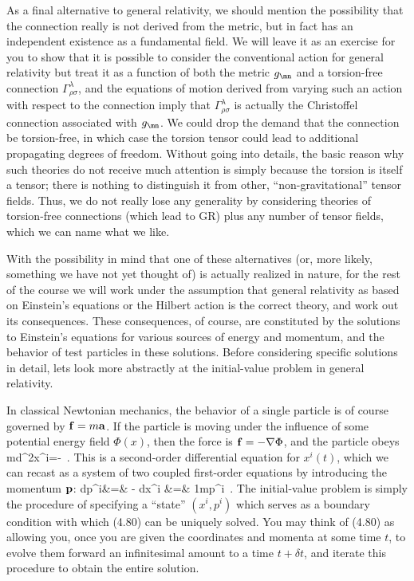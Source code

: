As a final alternative to general relativity, we should mention the
possibility that the connection really is not derived from the metric,
but in fact has an independent existence as a fundamental field.
We will leave it as an exercise for you to show that it is possible
to consider the conventional action for general relativity but treat
it as a function of both the metric $g_\mn$ and a torsion-free connection
$\Gamma^\lambda_{\rho\sigma}$,
and the equations of motion derived from varying such an action with
respect to the connection imply that $\Gamma^\lambda_{\rho\sigma}$ is
actually the Christoffel connection associated with $g_\mn$.  We could
drop the demand that the connection be torsion-free, in which case the
torsion tensor could lead to additional propagating degrees of freedom.
Without going into details, the basic reason why such theories do not
receive much attention is simply because the torsion is itself a tensor;
there is nothing to distinguish it from other, ``non-gravitational''
tensor fields.  Thus, we do not really lose any generality by considering
theories of torsion-free connections (which lead to GR) plus any number
of tensor fields, which we can name what we like.

With the possibility in mind that one of these alternatives (or, more
likely, something we have not yet thought of) is actually realized in
nature, for the rest of the course we will work under the assumption
that general relativity as based on Einstein's equations or the Hilbert
action is the correct theory, and work out its consequences.  These
consequences, of course, are constituted by the solutions to Einstein's
equations for various sources of energy and momentum, and the behavior
of test particles in these solutions.  Before considering specific
solutions in detail, lets look more abstractly at the initial-value
problem in general relativity.

In classical Newtonian mechanics, the behavior of a single particle 
is of course governed by ${\bf f} = m{\bf a}$.  If the particle is
moving under the influence of some potential energy field $\Phi(x)$,
then the force is ${\bf f} = -\nabla \Phi$, and the particle obeys
\be
  m{{d^2x^i}}=-\Phi\ .\label{4.79}
\ee
This is a second-order differential equation for $x^i(t)$, which we
can recast as a system of two coupled first-order equations by 
introducing the momentum ${\bf p}$:
\bea
  {{dp^i}}&=& -\Phi\cr
  {{dx^i}} &=&  {1\over m}p^i\ . \label{4.80}
\eea
The initial-value problem is simply the procedure of specifying a
``state'' $(x^i,p^i)$ which serves as a boundary condition with which
(4.80) can be uniquely solved.  You may think of (4.80) as allowing you,
once you are given the coordinates and momenta at some time $t$, to
evolve them forward an infinitesimal amount to a time $t+\delta t$,
and iterate this procedure to obtain the entire solution.


